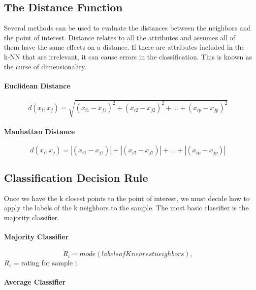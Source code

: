 \documentclass{report}
\begin{document}
\subsection*{The Distance Function}

Several methods can be used to evaluate the distances between the neighbors and the point of interest.
Distance relates to all the attributes and assumes all of them have the same effects on a distance.
If there are attributes included in the k-NN that are irrelevant, it can cause errors in the classification.
This is known as the curse of dimensionality. 

\paragraph*{Euclidean Distance}

\begin{equation}
d(x_{i},x_{j}) = \sqrt{(x_{i1} - x_{j1})^2 + (x_{i2} - x_{j2})^2 + ... + (x_{ip} - x_{jp})^2}
\end{equation}

\paragraph*{Manhattan Distance}

\begin{equation}
d(x_{i},x_{j}) = |(x_{i1} - x_{j1})| + |(x_{i2} - x_{j2})| + ... + |(x_{ip} - x_{jp})|
\end{equation}

\subsection*{Classification Decision Rule}

Once we have the k closest points to the point of interest, we must decide how to apply the labels of the k neighbors to the sample.
The most basic classifier is the majority classifier.

\paragraph{Majority Classifier}

\begin{equation}
R_i = mode(labels of K nearest neighbors),  
\end{equation}
$R_i$ = rating for sample i

\paragraph{Average Classifier}
\end{document}
